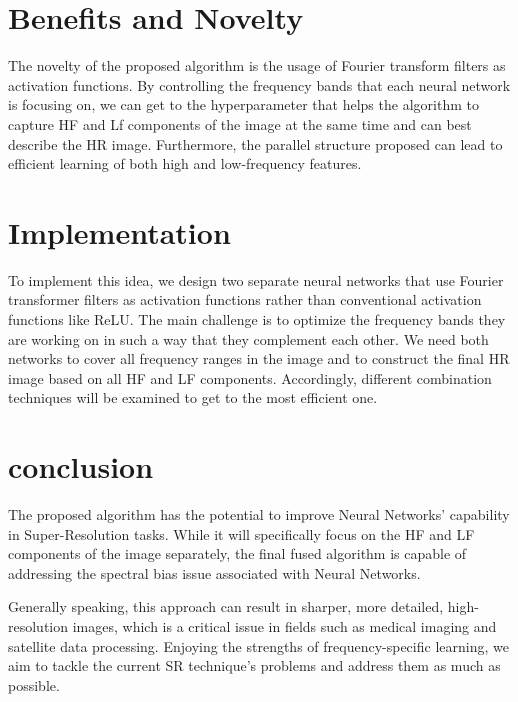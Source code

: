 \documentclass{article}
\begin{document}
\section{Benefits and Novelty}
The novelty of the proposed algorithm is the usage of Fourier transform filters as activation functions. By controlling the frequency bands that each neural network is focusing on, we can get to the hyperparameter that helps the algorithm to capture HF and Lf components of the image at the same time and can best describe the HR image. Furthermore, the parallel structure proposed can lead to efficient learning of both high and low-frequency features.

\section{Implementation}
To implement this idea, we design two separate neural networks that use Fourier transformer filters as activation functions rather than conventional activation functions like ReLU. The main challenge is to optimize the frequency bands they are working on in such a way that they complement each other. We need both networks to cover all frequency ranges in the image and to construct the final HR image based on all HF and LF components. Accordingly, different combination techniques will be examined to get to the most efficient one.

\section{conclusion}
The proposed algorithm has the potential to improve Neural Networks' capability in Super-Resolution tasks. While it will specifically focus on the HF and LF components of the image separately, the final fused algorithm is capable of addressing the spectral bias issue associated with Neural Networks.

Generally speaking, this approach can result in sharper, more detailed, high-resolution images, which is a critical issue in fields such as medical imaging and satellite data processing. Enjoying the strengths of frequency-specific learning, we aim to tackle the current SR technique's problems and address them as much as possible.


\end{document}
